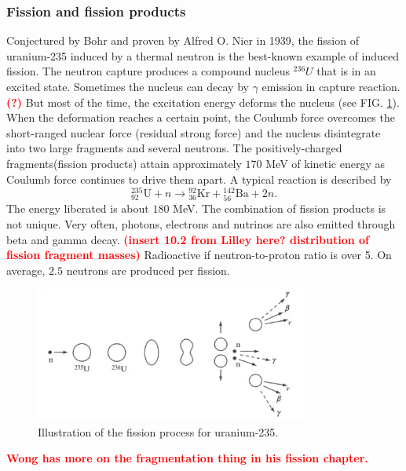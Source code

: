 \documentclass[preprint,aip,pra]{revtex4-1}
\newcommand{\red}[1]{\textcolor{red}{\bf #1}}
\begin{document}
        \subsubsection{Fission and fission products}
        Conjectured by Bohr and proven by Alfred O. Nier in 1939,
        the fission of uranium-235 induced by a thermal neutron
        is the best-known example of induced fission. 
        The neutron capture produces a compound nucleus ${}^{236}U$ that is in an excited state.
        Sometimes the nucleus can decay by $\gamma$ emission in capture reaction. \red{(?)}
        But most of the time, the excitation energy deforms the nucleus (see FIG. \ref{fig:fission}).
        When the
        deformation reaches a certain point, the Coulumb force overcomes the short-ranged nuclear
        force (residual strong force) and the nucleus disintegrate into two large fragments and several neutrons. The
        positively-charged fragments(fission products) attain approximately $170$ MeV of kinetic energy as
        Coulumb force continues to drive them apart.\cite{l01}
        A typical reaction is described by
        \[{}^{235}_{92}\text{U} + n \rightarrow {}^{92}_{36}\text{Kr} + {}^{142}_{56}\text{Ba} + 2 n.\]
        The energy liberated is about $180$ MeV. The combination of fission products is not
        unique. \cite{w98, gc01}
        Very often, photons, electrons and nutrinos are also emitted through beta and gamma decay.
        \red{(insert 10.2 from Lilley here? distribution of fission fragment masses)}
        Radioactive if neutron-to-proton ratio is over 5. On average, $2.5$ neutrons are produced per fission.\cite{l01} 
        \begin{figure}[h]
            \centering
            \includegraphics[width=0.8\textwidth]{fission.png}
            \caption{Illustration of the fission process for uranium-235.\cite{l01}}
            \label{fig:fission}
        \end{figure}

        \red{Wong has more on the fragmentation thing in his fission chapter.}
\end{document}
